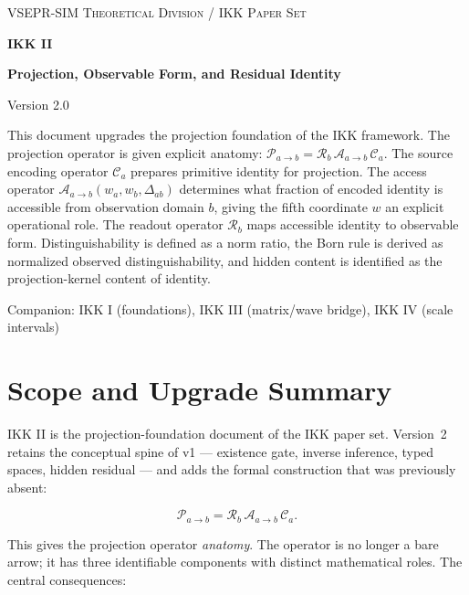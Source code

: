 \documentclass[11pt,a4paper,oneside]{article}
\newcommand{\Pab}{\mathcal{P}_{a\to b}}
\newcommand{\Ca}{\mathcal{C}_a}
\newcommand{\Aab}{\mathcal{A}_{a\to b}}
\newcommand{\Rb}{\mathcal{R}_b}
\newcommand{\wa}{w_a}
\newcommand{\wb}{w_b}
\newcommand{\Dab}{\Delta_{ab}}
\newcommand{\wcoord}{w}
\begin{document}
\begin{titlepage}
\centering
\vspace*{1.1cm}
{\large\scshape VSEPR-SIM Theoretical Division / IKK Paper Set\par}
\vspace{1.1cm}
{\Huge\bfseries IKK II\par}
\vspace{0.35cm}
{\Large\bfseries Projection, Observable Form, and Residual Identity\par}
\vspace{0.2cm}
{\large Version 2.0\par}
\vspace{1.1cm}
{\normalsize
This document upgrades the projection foundation of the IKK framework.
The projection operator is given explicit anatomy:
$\Pab = \Rb\,\Aab\,\Ca$.
The source encoding operator $\Ca$ prepares primitive identity for projection.
The access operator $\Aab(\wa, \wb, \Dab)$ determines what fraction of
encoded identity is accessible from observation domain $b$,
giving the fifth coordinate $\wcoord$ an explicit operational role.
The readout operator $\Rb$ maps accessible identity to observable form.
Distinguishability is defined as a norm ratio,
the Born rule is derived as normalized observed distinguishability,
and hidden content is identified as the projection-kernel content of identity.
\par}
\vfill
{\large Companion: IKK I (foundations), IKK III (matrix/wave bridge), IKK IV (scale intervals)\par}
\end{titlepage}

\tableofcontents
\clearpage

\section{Scope and Upgrade Summary}

IKK II is the projection-foundation document of the IKK paper set. Version~2 retains the conceptual spine of v1 --- existence gate, inverse inference, typed spaces, hidden residual --- and adds the formal construction that was previously absent:

\[
\boxed{\Pab = \Rb\,\Aab\,\Ca.}
\]

This gives the projection operator \emph{anatomy}. The operator is no longer a bare arrow; it has three identifiable components with distinct mathematical roles. The central consequences:
\end{document}
